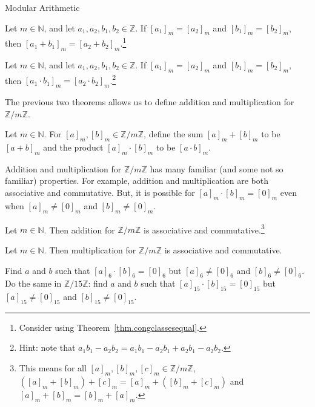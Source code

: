 \begin{section}{Modular Arithmetic}
\begin{theorem}
Let $m\in \mathbb{N}$, and let $a_1,a_2,b_1,b_2 \in \mathbb{Z}$. If $[a_1]_m = [a_2]_m$ and $[b_1]_m = [b_2]_m$, then $[a_1+b_1]_m = [a_2+b_2]_m$.\footnote{Consider using Theorem~\ref{thm.congclassesequal}.}
\end{theorem}

\begin{theorem}
Let $m\in \mathbb{N}$, and let $a_1,a_2,b_1,b_2 \in \mathbb{Z}$. If $[a_1]_m = [a_2]_m$ and $[b_1]_m = [b_2]_m$, then $[a_1\cdot b_1]_m = [a_2\cdot b_2]_m$.\footnote{Hint: note that $a_1b_1-a_2b_2 = a_1b_1 -a_2b_1 + a_2b_1-a_2b_2$.}
\end{theorem}

The previous two theorems allows us to define addition and multiplication for $\mathbb{Z}/m\mathbb{Z}$. 

\begin{definition}
Let $m\in \mathbb{N}$. For $[a]_m, [b]_m \in \mathbb{Z}/m\mathbb{Z}$, define the sum $[a]_m + [b]_m$ to be $[a+b]_m$ and the product $[a]_m \cdot [b]_m$ to be $ [a\cdot b]_m$.
\end{definition}

\begin{remark}
Addition and multiplication for $\mathbb{Z}/m\mathbb{Z}$ has many familiar (and some not so familiar) properties. For example, addition and multiplication are both associative and commutative. But, it is possible for $[a]_m\cdot[b]_m = [0]_m$ even when $[a]_m \neq [0]_m$ and $[b]_m \neq [0]_m$.
\end{remark}

\begin{theorem}
Let $m\in \mathbb{N}$. Then addition for $\mathbb{Z}/m\mathbb{Z}$ is associative and commutative.\footnote{This means for all $[a]_m, [b]_m, [c]_m \in \mathbb{Z}/m\mathbb{Z}$, $([a]_m + [b]_m) + [c]_m = [a]_m + ([b]_m + [c]_m)$ and $[a]_m + [b]_m = [b]_m + [a]_m$.}
\end{theorem}

\begin{theorem}
Let $m\in \mathbb{N}$. Then multiplication for $\mathbb{Z}/m\mathbb{Z}$ is associative and commutative.
\end{theorem}

\begin{exercise}
Find $a$ and $b$ such that $[a]_6\cdot[b]_6 = [0]_6$ but $[a]_6 \neq [0]_6$ and $[b]_6 \neq [0]_6$. Do the same in $\mathbb{Z}/15\mathbb{Z}$: find $a$ and $b$ such that $[a]_{15}\cdot[b]_{15} = [0]_{15}$ but $[a]_{15} \neq [0]_{15}$ and $[b]_{15} \neq [0]_{15}$.
\end{exercise}


\end{section}
